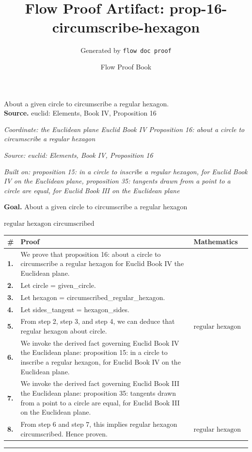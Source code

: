 \documentclass[11pt]{article}
\title{Flow Proof Artifact: prop-16-circumscribe-hexagon}
\author{Generated by \texttt{flow doc proof}}
\date{Flow Proof Book}
\theoremstyle{definition}
\begin{document}
\maketitle
About a given circle to circumscribe a regular hexagon.\\[0.5em]
\textbf{Source.} euclid: Elements, Book IV, Proposition 16\\[0.5em]
\bigskip
{}\par
\smallskip\noindent\textit{Coordinate: the Euclidean plane \cdot Euclid Book IV \cdot Proposition 16: about a circle to circumscribe a regular hexagon}\par
\smallskip\noindent\textit{Source: euclid: Elements, Book IV, Proposition 16}\par
\smallskip\noindent\textit{Built on: proposition 15: in a circle to inscribe a regular hexagon, for Euclid Book IV on the Euclidean plane, proposition 35: tangents drawn from a point to a circle are equal, for Euclid Book III on the Euclidean plane}\par
\medskip
\noindent\textbf{Goal.} About a given circle to circumscribe a regular hexagon\par
\noindent$\displaystyle \text{regular hexagon circumscribed}$\par
\medskip
\noindent
\begin{tabular}{@{} >{\raggedright\arraybackslash}p{} >{\raggedright\arraybackslash}p{} >{\raggedleft\arraybackslash}p{} @{}}
\textbf{\#} & \textbf{Proof} & \textbf{Mathematics} \\
\midrule
\textbf{1.} & We prove that proposition 16: about a circle to circumscribe a regular hexagon for Euclid Book IV the Euclidean plane. & \\[0.45em]
\textbf{2.} & Let circle = given\_circle. & \\[0.45em]
\textbf{3.} & Let hexagon = circumscribed\_regular\_hexagon. & \\[0.45em]
\textbf{4.} & Let sides\_tangent = hexagon\_sides. & \\[0.45em]
\textbf{5.} & From step 2, step 3, and step 4, we can deduce that regular hexagon about circle. & $\displaystyle \text{regular hexagon about circle}$ \\[0.45em]
\textbf{6.} & We invoke the derived fact governing Euclid Book IV the Euclidean plane: proposition 15: in a circle to inscribe a regular hexagon, for Euclid Book IV on the Euclidean plane. & \\[0.45em]
\textbf{7.} & We invoke the derived fact governing Euclid Book III the Euclidean plane: proposition 35: tangents drawn from a point to a circle are equal, for Euclid Book III on the Euclidean plane. & \\[0.45em]
\textbf{8.} & From step 6 and step 7, this implies regular hexagon circumscribed. Hence proven. & $\displaystyle \text{regular hexagon circumscribed}$ \\[0.45em]
\bottomrule
\end{tabular}
\label{thm:Geometry-Euclid Book IV-proposition_16_about_a_circle_to_circumscribe_a_regular_hexagon}
\par\medskip\hrule
\end{document}
